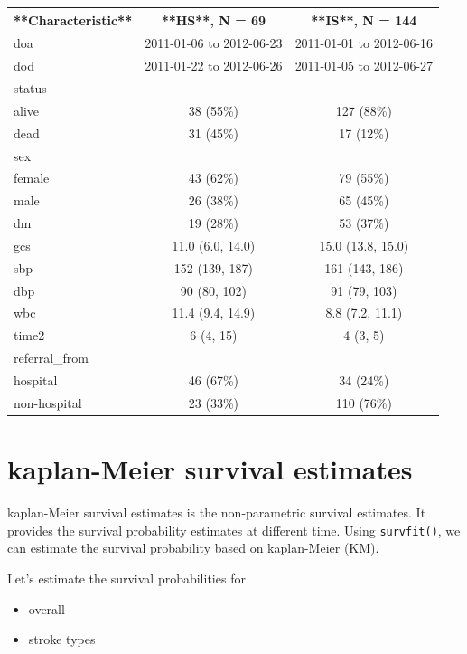 \documentclass[
  10pt,
]{krantz}
\providecommand{\tightlist}{%
  \setlength{\itemsep}{0pt}\setlength{\parskip}{0pt}}
\begin{document}
\begin{tabular}{l|c|c}
\hline
**Characteristic** & **HS**, N = 69 & **IS**, N = 144\\
\hline
doa & 2011-01-06 to 2012-06-23 & 2011-01-01 to 2012-06-16\\
\hline
dod & 2011-01-22 to 2012-06-26 & 2011-01-05 to 2012-06-27\\
\hline
status &  & \\
\hline
alive & 38 (55\%) & 127 (88\%)\\
\hline
dead & 31 (45\%) & 17 (12\%)\\
\hline
sex &  & \\
\hline
female & 43 (62\%) & 79 (55\%)\\
\hline
male & 26 (38\%) & 65 (45\%)\\
\hline
dm & 19 (28\%) & 53 (37\%)\\
\hline
gcs & 11.0 (6.0, 14.0) & 15.0 (13.8, 15.0)\\
\hline
sbp & 152 (139, 187) & 161 (143, 186)\\
\hline
dbp & 90 (80, 102) & 91 (79, 103)\\
\hline
wbc & 11.4 (9.4, 14.9) & 8.8 (7.2, 11.1)\\
\hline
time2 & 6 (4, 15) & 4 (3, 5)\\
\hline
referral\_from &  & \\
\hline
hospital & 46 (67\%) & 34 (24\%)\\
\hline
non-hospital & 23 (33\%) & 110 (76\%)\\
\hline
\end{tabular}

\hypertarget{kaplan-meier-survival-estimates}{%
\section{\texorpdfstring{kaplan-Meier survival estimates}{kaplan-Meier survival estimates}}\label{kaplan-meier-survival-estimates}}

kaplan-Meier survival estimates is the non-parametric survival estimates. It provides the survival probability estimates at different time. Using \texttt{survfit()}, we can estimate the survival probability based on kaplan-Meier (KM).

Let's estimate the survival probabilities for

\begin{itemize}
\tightlist
\item
  overall
\item
  stroke types
\end{itemize}
\end{document}

